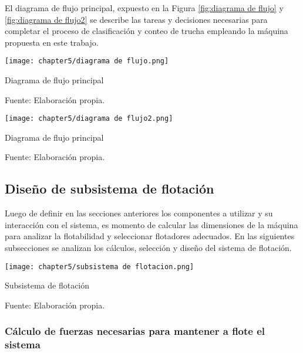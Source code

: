 El diagrama de flujo principal, expuesto en la Figura \ref{fig:diagrama de flujo} y \ref{fig:diagrama de flujo2} se describe las tareas y decisiones necesarias para completar el proceso de clasificación y conteo de trucha empleando la máquina propuesta en este trabajo.

\begin{myfigure}[H]
	\footnotesize\centering
	\texttt{[image: chapter5/diagrama de flujo.png]}
	\caption{Diagrama de flujo principal}
	\begin{myflushcenter}
		Fuente: Elaboración propia.
	\end{myflushcenter}
	\label{fig:diagrama de flujo}
\end{myfigure}

\begin{myfigure}[H]
	\footnotesize\centering
	\texttt{[image: chapter5/diagrama de flujo2.png]}
	\caption{Diagrama de flujo principal}
	\begin{myflushcenter}
		Fuente: Elaboración propia.
	\end{myflushcenter}
	\label{fig:diagrama de flujo2}
\end{myfigure}


\subsection{Diseño de subsistema de flotación}
\label{ssec:diseno de subsistema de flotacion}

Luego de definir en las secciones anteriores los componentes a utilizar y su interacción con el sistema, es momento de calcular las dimensiones de la máquina para analizar la flotabilidad y seleccionar flotadores adecuados. En las siguientes subsecciones se analizan los cálculos, selección y diseño del sistema de flotación.

\begin{myfigure}[H]
	\footnotesize\centering
	\texttt{[image: chapter5/subsistema de flotacion.png]}
	\caption{Subsistema de flotación}
	\begin{myflushcenter}
		Fuente: Elaboración propia.
	\end{myflushcenter}
	\label{fig:subsistema de flotacion}
\end{myfigure}

\subsubsection{Cálculo de fuerzas necesarias para mantener a flote el sistema}

